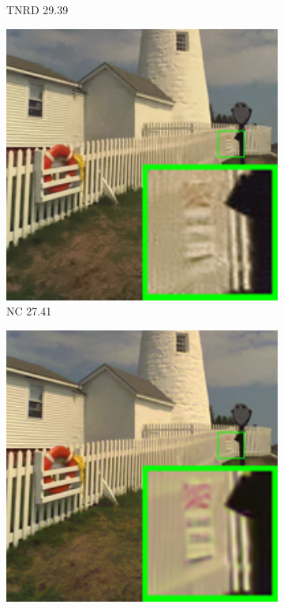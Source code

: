 \begin{figure}
\begin{subfigure}[t]{0.19\textwidth}
\caption{TNRD 29.39}
    \end{subfigure}
    \hfill
    \begin{subfigure}[t]{0.19\textwidth}
        \centering
        \includegraphics[width=1\textwidth]{images/mcwnnm/24images/resize_br_NC_nSig301050_kodim19.png}
		\caption{NC 27.41}
    \end{subfigure}
    \hfill
    \begin{subfigure}[t]{0.19\textwidth}
        \centering
        \includegraphics[width=1\textwidth]{images/mcwnnm/24images/resize_br_WNNMCW_nSig301050_kodim19.png}

\end{subfigure}
\end{figure}
